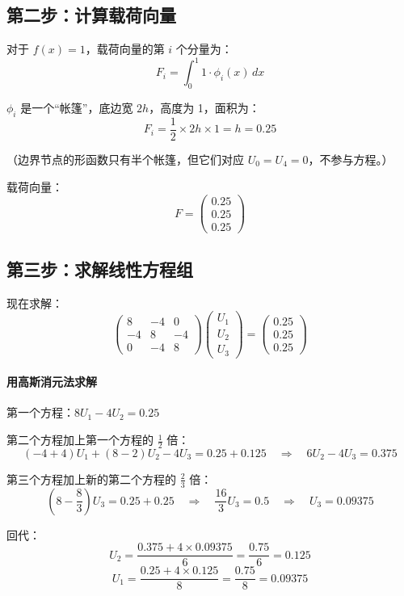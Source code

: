 \subsection{第二步：计算载荷向量}

对于 $f(x) = 1$，载荷向量的第 $i$ 个分量为：
\[
F_i = \int_0^1 1 \cdot \phi_i(x) \, dx
\]

$\phi_i$ 是一个“帐篷”，底边宽 $2h$，高度为 1，面积为：
\[
F_i = \frac{1}{2} \times 2h \times 1 = h = 0.25
\]

（边界节点的形函数只有半个帐篷，但它们对应 $U_0 = U_4 = 0$，不参与方程。）

载荷向量：
\[
F = \begin{pmatrix} 0.25 \\ 0.25 \\ 0.25 \end{pmatrix}
\]

\subsection{第三步：求解线性方程组}

现在求解：
\[
\begin{pmatrix}
8 & -4 & 0 \\
-4 & 8 & -4 \\
0 & -4 & 8
\end{pmatrix}
\begin{pmatrix} U_1 \\ U_2 \\ U_3 \end{pmatrix}
=
\begin{pmatrix} 0.25 \\ 0.25 \\ 0.25 \end{pmatrix}
\]

\paragraph{用高斯消元法求解}

第一个方程：$8U_1 - 4U_2 = 0.25$

第二个方程加上第一个方程的 $\frac{1}{2}$ 倍：
\[
(-4 + 4)U_1 + (8 - 2)U_2 - 4U_3 = 0.25 + 0.125 \quad \Rightarrow \quad 6U_2 - 4U_3 = 0.375
\]

第三个方程加上新的第二个方程的 $\frac{2}{3}$ 倍：
\[
(8 - \frac{8}{3})U_3 = 0.25 + 0.25 \quad \Rightarrow \quad \frac{16}{3}U_3 = 0.5 \quad \Rightarrow \quad U_3 = 0.09375
\]

回代：
\[
U_2 = \frac{0.375 + 4 \times 0.09375}{6} = \frac{0.75}{6} = 0.125
\]
\[
U_1 = \frac{0.25 + 4 \times 0.125}{8} = \frac{0.75}{8} = 0.09375
\]

